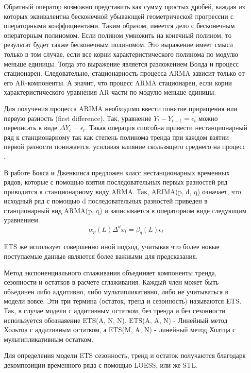 \documentclass[12pt, a4paper]{article} %
\begin{document}
Обратный оператор возможно представить как сумму простых дробей, каждая из которых эквивалентна бесконечной убывающей геометрической прогрессии с операторными коэффициентами. Таким образом, имеется дело с бесконечным операторным полиномом. Если полином умножить на конечный полином, то результат будет также бесконечным полиномом. Это выражение имеет смысл только в том случае, если все корни характеристического полинома по модулю меньше единицы. Тогда это выражение является разложением Волда и процесс стационарен. Следовательно, стационарность процесса ARMA зависит только от его AR-компоненты.
А значит, что процесс ARMA стационарен, если корни характеристического уравнения AR части по модулю меньше единицы. 

Для получения процесса ARIMA необходимо ввести понятие приращения или первую разность (first difference). Так, уравнение $Y_t-Y_{t-1}=\epsilon_t$ можно переписать в виде $\Delta Y_t=\epsilon_t$. Такая операция способна привести нестанционарный ряд к станционарному так как степень полинома тренда при каждом взятии первой разности понижается, усиливая влияние скользящего среднего на процесс \cite{Kantorovich}. 

В работе Бокса и Дженкинса \cite{Box} предложен класс нестанционарных временных рядов, которые с помощью взятия последовательных первых разностей ряд приводится к станционарному виду ARMA. Так, ARIMA(p, d, q) означает, что исходный ряд с помощью d последовательных разностей приведен в станционарный вид ARMA(p, q) и записывается в операторном виде следующим уравнением.
\begin{equation}
    \alpha_p(L)\Delta^dx_t=\beta_q(L)\epsilon_t
\end{equation}

ETS же использует совершенно иной подход, учитывая что более новые поступаемые данные являются более важными для предсказания. 

Метод экспоненциального сглаживания объединяет компоненты тренда, сезонности и остатков в расчете сглаживания. Каждый член может быть объединен либо аддитивно, либо мультипликативно, либо не учитываться в модели вовсе. Эти три термина (остаток, тренд и сезонность) называются ETS\cite{Spyros}.
Так, в случае модели с аддитивным остатком, без тренда и без сезонности используется обознаяение ETS(A, N, N), ETS(A, A, N) - Линейный метод Хольтца с аддитивным остатком, а ETS(M, A, N) - линейный метод Холтца с мультипликативным остатком.

Для определения модели ETS сезонность, тренд и остаток получаются благодаря декомпозиции временного ряда с помощью LOESS, или же STL\cite{Cleveland}.
\end{document}

